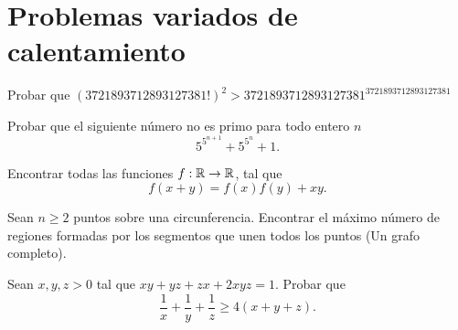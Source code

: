 \section{\large Problemas variados de calentamiento}

\begin{problem}
    Probar que $(3721893712893127381!)^2 > 3721893712893127381^{3721893712893127381}$
\end{problem}

\begin{problem}
    Probar que el siguiente número no es primo para todo entero $n$ $$5^{5^{n+1}} + 5^{5^n} + 1.$$
\end{problem}

\begin{problem}
    Encontrar todas las funciones $f:\mathbb{R} \rightarrow \mathbb{R}$, tal que $$f(x+y)=f(x)f(y)+xy.$$
\end{problem}

\begin{problem}
    Sean $n\geq2$ puntos sobre una circunferencia. Encontrar el máximo número de regiones
    formadas por los segmentos que unen todos los puntos (Un grafo completo).
\end{problem}

\begin{problem}
    Sean $x,y,z > 0$ tal que $xy+yz+zx+2xyz=1$. Probar que $$\frac{1}{x} + \frac{1}{y} + \frac{1}{z} \geq 4(x+y+z).$$
\end{problem}